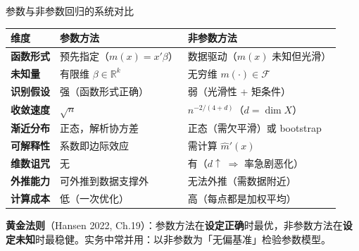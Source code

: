\documentclass[aspectratio=169, 10pt]{beamer}
\renewcommand{\arraystretch}{1.05}
\begin{document}
\begin{frame}{参数与非参数回归的系统对比}
  \centering\small
  \renewcommand{\arraystretch}{1.25}
  \begin{tabular}{@{}p{3.4cm}p{5.0cm}p{5.0cm}@{}}
    \toprule
    \textbf{维度} & \textbf{参数方法} & \textbf{非参数方法} \\
    \midrule
    \textbf{函数形式} & 预先指定（$m(x)=x'\beta$） & 数据驱动（$m(x)$ 未知但光滑） \\
    \textbf{未知量} & 有限维 $\beta\in\mathbb{R}^k$ & 无穷维 $m(\cdot)\in\mathcal{F}$ \\
    \textbf{识别假设} & 强（函数形式正确） & 弱（光滑性 + 矩条件） \\
    \textbf{收敛速度} & $\sqrt{n}$ & $n^{-2/(4+d)}$（$d=\dim X$） \\
    \textbf{渐近分布} & 正态，解析协方差 & 正态（需欠平滑）或 bootstrap \\
    \textbf{可解释性} & 系数即边际效应 & 需计算 $\hat m'(x)$ \\
    \textbf{维数诅咒} & 无 & 有（$d\uparrow\;\Rightarrow$ 率急剧恶化） \\
    \textbf{外推能力} & 可外推到数据支撑外 & 无法外推（需数据附近） \\
    \textbf{计算成本} & 低（一次优化） & 高（每点都是加权平均） \\
    \bottomrule
  \end{tabular}

  \begin{keybox}
    \textbf{黄金法则}（Hansen 2022, Ch.19）：参数方法在\textbf{设定正确}时最优，非参数方法在\textbf{设定未知}时最稳健。实务中常并用：以非参数为「无偏基准」检验参数模型。
  \end{keybox}
\end{frame}
\end{document}
